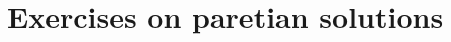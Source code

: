 \documentclass[\main/main.tex]{subfiles}
\begin{document}
\section{Exercises on paretian solutions}

\clearpage

\end{document}
